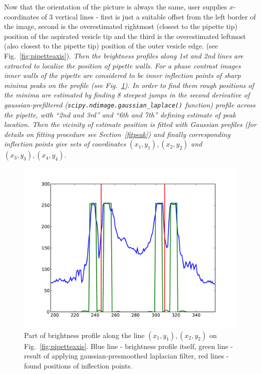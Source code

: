 Now that the orientation of the picture is always the same, user supplies $x$-coordinates of 3 vertical lines - first is just a suitable offset from the left border of the image, second is the overestimated rightmost (closest to the pipette tip) position of the aspirated vesicle tip and the third is the overestimated leftmost (also closest to the pipette tip) position of the outer vesicle edge. (see Fig.~\ref{fig:pipetteaxis}). \textsl{Then the brightness profiles along 1st and 2nd lines are extracted to localize the position of pipette walls. For a phase contrast images inner walls of the pipette are considered to be inner inflection points of sharp minima peaks on the profile (see Fig.~\ref{fig:pipetteprofile}). In order to find them rough positions of the minima are estimated by finding 8 steepest jumps in the second derivative of gaussian-prefiltered (\texttt{scipy.ndimage.gaussian\_laplace()} function) profile across the pipette, with ``2nd and 3rd'' and ``6th and 7th'' defining estimate of peak location. Then the vicinity of estimate position is fitted with Gaussian profiles (for details on fitting procedure see Section~\ref{fitpeak}) and finally corresponding inflection points give sets of coordinates $(x_1,y_1), (x_2,y_2)$ and $(x_3,y_3), (x_4,y_4)$.}

\begin{figure}%
\includegraphics[width=\columnwidth]{figs/pipetteprofile.pdf}%
\caption{Part of brightness profile along the line $(x_1,y_1), (x_2,y_2)$ on Fig.~\ref{fig:pipetteaxis}. Blue line - brightness profile itself, green line - result of applying gaussian-presmoothed laplacian filter, red lines - found positions of inflection points.}%
\label{fig:pipetteprofile}%
\end{figure}

